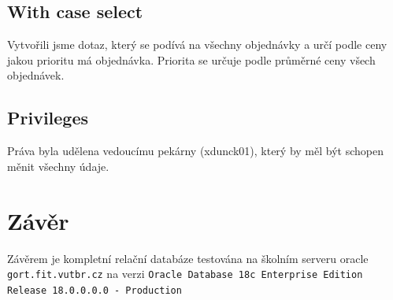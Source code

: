 \documentclass[a4paper, 12pt]{article}
\begin{document}
\subsection{With case select}
Vytvořili jsme dotaz, který se podívá na všechny objednávky a určí podle ceny jakou prioritu má objednávka. Priorita se určuje podle průměrné ceny všech objednávek.

\subsection{Privileges}
Práva byla udělena vedoucímu pekárny (xdunck01), který by měl být schopen měnit všechny údaje.

\section{Závěr}
Závěrem je kompletní relační databáze testována na školním serveru oracle \texttt{gort.fit.vutbr.cz} na verzi \texttt{Oracle Database 18c Enterprise Edition Release 18.0.0.0.0 - Production}
\end{document}

